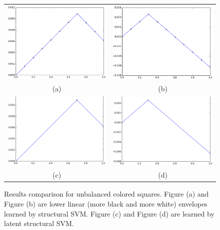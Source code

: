 \begin{figure}[ht]
  \centering
  \setlength{\tabcolsep}{2pt}
  \begin{tabular}{cc}
    \includegraphics[width=0.5\columnwidth]{Experiments/figures/unba_black_res_old.png}&
                                                                              \includegraphics[width=0.5\columnwidth]{Experiments/figures/unba_white_res_old.png}\\
    {\small (a)} & {\small (b)} \\
    \includegraphics[width=0.5\columnwidth]{Experiments/figures/unba_black_res_new.png}&
                                                                              \includegraphics[width=0.5\columnwidth]{Experiments/figures/unba_white_res_new.png}\\
    {\small (c)} & {\small (d)} 
  \end{tabular}
  \caption{\label{fig:unba_results} Results comparison for
    unbalanced colored squares. Figure (a) and Figure (b) are
    lower linear (more black and more white) envelopes learned by
    structural SVM. Figure (c) and Figure (d) are learned by
    latent structural SVM.}
\end{figure}


